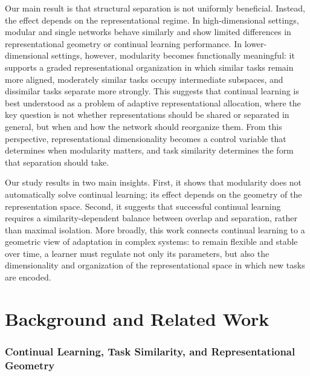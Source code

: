 \documentclass[letterpaper]{article}
\begin{document}
        Our main result is that structural separation is not uniformly beneficial. Instead, the effect depends on the representational regime. In high-dimensional settings, modular and single networks behave similarly and show limited differences in representational geometry or continual learning performance. In lower-dimensional settings, however, modularity becomes functionally meaningful: it supports a graded representational organization in which similar tasks remain more aligned, moderately similar tasks occupy intermediate subspaces, and dissimilar tasks separate more strongly. This suggests that continual learning is best understood as a problem of adaptive representational allocation, where the key question is not whether representations should be shared or separated in general, but when and how the network should reorganize them. From this perspective, representational dimensionality becomes a control variable that determines when modularity matters, and task similarity determines the form that separation should take.
        
        Our study results in two main insights. First, it shows that modularity does not automatically solve continual learning; its effect depends on the geometry of the representation space. Second, it suggests that successful continual learning requires a similarity-dependent balance between overlap and separation, rather than maximal isolation. More broadly, this work connects continual learning to a geometric view of adaptation in complex systems: to remain flexible and stable over time, a learner must regulate not only its parameters, but also the dimensionality and organization of the representational space in which new tasks are encoded.


\section{Background and Related Work}

\subsubsection{Continual Learning, Task Similarity, and Representational Geometry}
\end{document}
